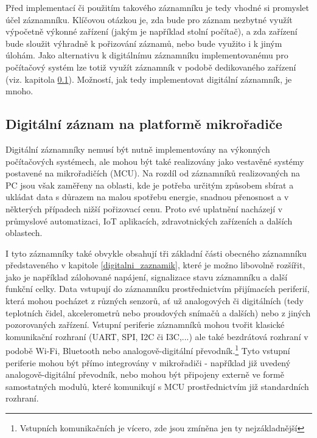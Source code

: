 Před implementací či použitím takového záznamníku je tedy vhodné si promyslet účel záznamníku. Klíčovou otázkou je, zda bude pro záznam nezbytné využít výpočetně výkonné zařízení (jakým je například stolní počítač), a zda zařízení bude sloužit výhradně k pořizování záznamů, nebo bude využito i k jiným úlohám. Jako alternativu k digitálnímu záznamníku implementovanému pro počítačový systém lze totiž využít záznamník v podobě dedikovaného zařízení (viz. kapitola \ref{digitalni_zaznamnik_mikroradic}). Možností, jak tedy implementovat digitální záznamník, je mnoho.


\subsection{Digitální záznam na platformě mikrořadiče}
\label{digitalni_zaznamnik_mikroradic}
Digitální záznamníky nemusí být nutně implementovány na výkonných počítačových systémech, ale mohou být také realizovány jako vestavěné systémy postavené na mikrořadičích (MCU). Na rozdíl od záznamníků realizovaných na PC jsou však zaměřeny na oblasti, kde je potřeba určitým způsobem sbírat a ukládat data s důrazem na malou spotřebu energie, snadnou přenosnost a v některých případech nižší pořizovací cenu. Proto své uplatnění nacházejí v průmyslové automatizaci, IoT aplikacích, zdravotnických zařízeních a dalších oblastech. \cite{cas_industrial_dataloggers, madgetech_dataloggers_healthcare, springer_industry_monitoring, springer_healthcare_iot_monitoring}

I tyto záznamníky také obvykle obsahují tři základní části obecného záznamníku představeného v kapitole \ref{digitalni_zaznamik}, které je možno libovolně rozšířit, jako je například zálohované napájení, signalizace stavu záznamníku a další funkční celky. Data vstupují do záznamníku prostřednictvím přijímacích periferií, která mohou pocházet z různých senzorů, ať už analogových či digitálních (tedy teplotních čidel, akcelerometrů nebo proudových snímačů a dalších) nebo z jiných pozorovaných zařízení. Vstupní periferie záznamníků mohou tvořit klasické komunikační rozhraní (UART, SPI, I2C či I3C,...) ale také bezdrátová rozhraní v podobě Wi-Fi, Bluetooth nebo analogově-digitální převodník.\footnote{Vstupních komunikačních je vícero, zde jsou zmíněna jen ty nejzákladnější} Tyto vstupní periferie mohou být přímo integrovány v mikrořadiči - například již uvedený analogově-digitální převodník, nebo mohou být připojeny externě ve formě samostatných modulů, které komunikují s MCU prostřednictvím již standardních rozhraní.

